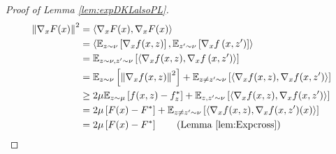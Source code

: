 \iffalse
\begin{proof}[Proof of Lemma \ref{lem:expDKLalsoPL}]
    \begin{align}
    \left\|\nabla_x F(x)\right\|^2&=\left\langle\nabla_x F(x), \nabla_x F(x)\right\rangle \notag
    \\
&=\left\langle\mathbb{E}_{z\sim \nu}\left[\nabla_x f(x, z)\right], \mathbb{E}_{z^{\prime}\sim\nu}\left[\nabla_x f\left(x, z^{\prime}\right)\right]\right\rangle \notag
    \\
    &=\mathbb{E}_{z\sim \nu, z^{\prime}\sim \nu}\left[\left\langle\nabla_x f(x, z), \nabla_x f\left(x, z^{\prime}\right)\right\rangle\right] \notag
    \\
    &=\mathbb{E}_{z \sim \nu}\left[\left\|\nabla_x f(x,z)\right\|^2\right]+\mathbb{E}_{z\neq z^{\prime} \sim \nu}\left[\left\langle\nabla_x f(x,z), \nabla_x f(x,{z^{\prime}})\right\rangle\right] \notag
    \\
    &\geq 2 \mu \mathbb{E}_{z \sim \mu}\left[f(x,z)-f_z^*\right]+\mathbb{E}_{z, z^{\prime} \sim \nu}\left[\left\langle\nabla_x f(x,z), \nabla_x f(x,z^{\prime})\right\rangle\right] \notag
    \\
    &=2 \mu\left[F(x)-F^*\right]+\mathbb{E}_{z\neq z^{\prime} \sim \nu}\left[\left\langle\nabla_x f(x,z), \nabla_x f(x,z^{\prime})(x)\right\rangle\right] \notag
    \\
    &=2 \mu\left[F(x)-F^*\right] \tag{Lemma \ref{lem:Expcross}}
\end{align}
\end{proof}

